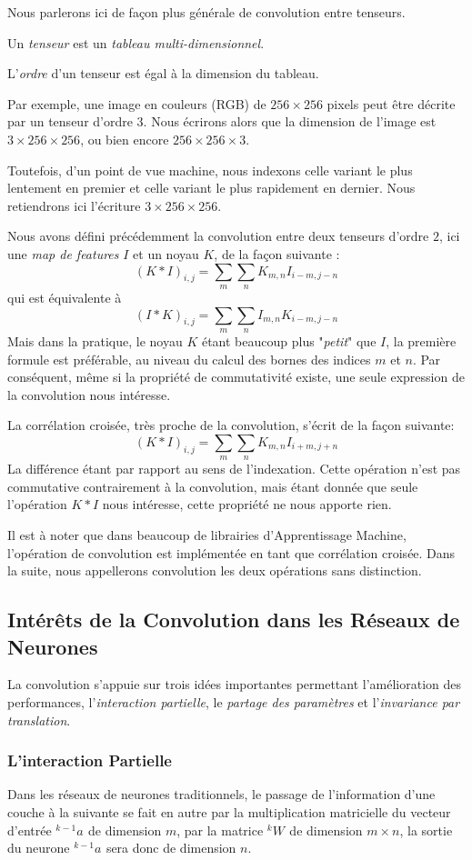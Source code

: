 \documentclass[a4paper, 10pt]{report}
\newcommand{\lexp}[1]{\phantom{}^{#1}}
\newcommand{\elem}[4]{\lexp{#2}#1^{#3}_{#4}}
\begin{document}
Nous parlerons ici de façon plus générale de convolution entre tenseurs.
\begin{center}
	Un \emph{tenseur} est un \emph{tableau multi-dimensionnel}.
	
	L'\emph{ordre} d'un tenseur est égal à la dimension du tableau.
\end{center}
Par exemple, une image en couleurs (RGB) de $256 \times 256$ pixels peut être décrite par un tenseur d'ordre $3$.
Nous écrirons alors que la dimension de l'image est $3 \times 256 \times 256$, ou bien encore $256 \times 256 \times 3$.

Toutefois, d'un point de vue machine, nous indexons celle variant le plus lentement en premier et celle variant le plus rapidement en dernier. Nous retiendrons ici l'écriture $3 \times 256 \times 256$.

Nous avons défini précédemment la convolution entre deux tenseurs d'ordre $2$, ici une \emph{map de features} $I$ et un noyau $K$, de la façon suivante :
$$(K*I)_{i,j} = \sum_{m}\sum_{n}{K_{m,n}I_{i-m,j-n}}$$
qui est équivalente à 
$$(I*K)_{i,j} = \sum_{m}\sum_{n}{I_{m,n}K_{i-m,j-n}}$$
Mais dans la pratique, le noyau $K$ étant beaucoup plus "\emph{petit}" que $I$, la première formule est préférable, au niveau du calcul des bornes des indices $m$ et $n$.
Par conséquent, même si la propriété de commutativité existe, une seule expression de la convolution nous intéresse.

La corrélation croisée, très proche de la convolution, s'écrit de la façon suivante:
$$(K*I)_{i,j} = \sum_{m}\sum_{n}{K_{m,n}I_{i+m,j+n}}$$
La différence étant par rapport au sens de l'indexation. Cette opération n'est pas commutative contrairement à la convolution, mais étant donnée que seule l'opération $K*I$ nous intéresse, cette propriété ne nous apporte rien.

Il est à noter que dans beaucoup de librairies d'Apprentissage Machine, l'opération de convolution est implémentée en tant que corrélation croisée. Dans la suite, nous appellerons convolution les deux opérations sans distinction.
			
\subsection{Intérêts de la Convolution dans les Réseaux de Neurones}
La convolution s'appuie sur trois idées importantes permettant l'amélioration des performances, l'\emph{interaction partielle}, le \emph{partage des paramètres} et l'\emph{invariance par translation}.
\subsubsection{L'interaction Partielle}
Dans les réseaux de neurones traditionnels, le passage de l'information d'une couche à la suivante se fait en autre par la multiplication matricielle du vecteur d'entrée $\elem{a}{k-1}{}{}$ de dimension $m$, par la matrice $\elem{W}{k}{}{}$ de dimension $m \times n$, la sortie du neurone $\elem{a}{k-1}{}{}$ sera donc de dimension $n$.
\end{document}
